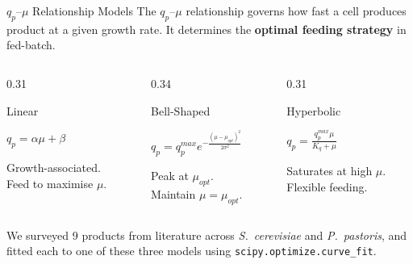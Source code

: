 \documentclass[aspectratio=169, 11pt]{beamer}
\begin{document}
\begin{frame}{$q_p$--$\mu$ Relationship Models}
  The $q_p$--$\mu$ relationship governs how fast a cell produces product at a given growth rate.
  It determines the \textbf{optimal feeding strategy} in fed-batch.

  \vspace{0.2cm}
  \begin{columns}[T]
    \begin{column}{0.31\textwidth}
      \begin{block}{Linear}
        \begin{center}
          $q_p = \alpha \mu + \beta$
        \end{center}
        \vspace{0.1cm}
        {\small Growth-associated.\\Feed to maximise $\mu$.}
      \end{block}
    \end{column}
    \begin{column}{0.34\textwidth}
      \begin{block}{Bell-Shaped}
        \begin{center}
          $q_p = q_p^{max} e^{-\frac{(\mu - \mu_{opt})^2}{2\sigma^2}}$
        \end{center}
        \vspace{0.1cm}
        {\small Peak at $\mu_{opt}$.\\Maintain $\mu = \mu_{opt}$.}
      \end{block}
    \end{column}
    \begin{column}{0.31\textwidth}
      \begin{block}{Hyperbolic}
        \begin{center}
          $q_p = \frac{q_p^{max} \mu}{K_q + \mu}$
        \end{center}
        \vspace{0.1cm}
        {\small Saturates at high $\mu$.\\Flexible feeding.}
      \end{block}
    \end{column}
  \end{columns}

  \vspace{0.3cm}
  {\small We surveyed 9 products from literature across \textit{S.\ cerevisiae} and \textit{P.\ pastoris},
  and fitted each to one of these three models using \texttt{scipy.optimize.curve\_fit}.}
\end{frame}
\end{document}
